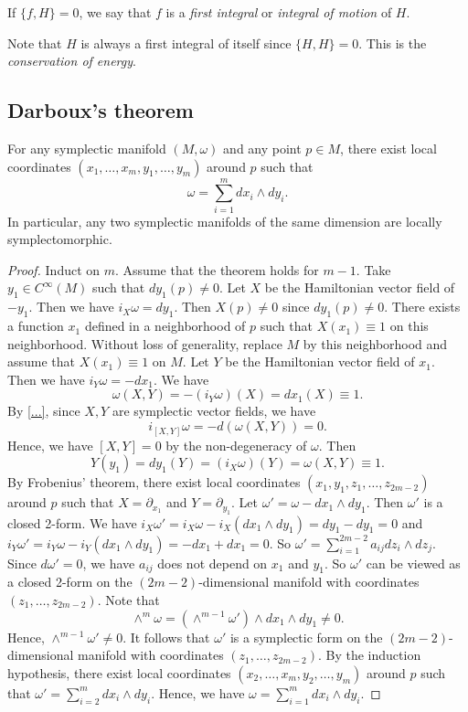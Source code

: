   \begin{definition}
    If $\{f,H\} = 0$, we say that $f$ is a \emph{first integral} or \emph{integral of motion} of $H$.
  \end{definition}

  Note that $H$ is always a first integral of itself since $\{H,H\} = 0$.
  This is the \emph{conservation of energy}.


\subsection{Darboux's theorem}

  \begin{theorem}\label{thm:Darboux}
    For any symplectic manifold $(M,\omega)$ and any point $p \in M$, there exist local coordinates $(x_1, \ldots, x_m, y_1, \ldots, y_m)$ around $p$ such that
    \[ \omega = \sum_{i=1}^m dx_i \wedge dy_i. \]
   In particular, any two symplectic manifolds of the same dimension are locally symplectomorphic.
  \end{theorem}
  \begin{proof}
    Induct on $m$.
    Assume that the theorem holds for $m-1$.
    Take $y_1 \in C^\infty(M)$ such that $dy_1(p) \neq 0$.
    Let $X$ be the Hamiltonian vector field of $-y_1$.
    Then we have $i_X \omega = dy_1$.
    Then $X(p) \neq 0$ since $dy_1(p) \neq 0$.
    There exists a function $x_1$ defined in a neighborhood of $p$ such that $X(x_1) \equiv 1$ on this neighborhood.
    Without loss of generality, replace $M$ by this neighborhood and assume that $X(x_1) \equiv 1$ on $M$.
    Let $Y$ be the Hamiltonian vector field of $x_1$.
    Then we have $i_Y \omega = -dx_1$.
    We have
    \[ \omega(X,Y) = -(i_Y \omega)(X) = dx_1(X) \equiv 1. \]
    By \cref{...}, since $X,Y$ are symplectic vector fields, we have 
    \[ i_{[X,Y]} \omega =  - d(\omega(X,Y)) = 0. \]
    Hence, we have $[X,Y] = 0$ by the non-degeneracy of $\omega$.
    Then 
    \[ Y(y_1) = dy_1(Y) = (i_X \omega)(Y) = \omega(X,Y) \equiv 1. \]
    By Frobenius' theorem, there exist local coordinates $(x_1, y_1, z_1, \ldots, z_{2m-2})$ around $p$ such that $X = \partial_{x_1}$ and $Y = \partial_{y_1}$.
    Let $\omega' = \omega - dx_1 \wedge dy_1$.
    Then $\omega'$ is a closed 2-form.
    We have $i_X \omega' = i_X \omega - i_X (dx_1 \wedge dy_1) = dy_1 - dy_1 = 0$ and $i_Y \omega' = i_Y \omega - i_Y (dx_1 \wedge dy_1) = -dx_1 + dx_1 = 0$.
    So $\omega' = \sum_{i=1}^{2m-2} a_{ij} dz_i \wedge dz_j$.
    Since $d\omega' = 0$, we have $a_{ij}$ does not depend on $x_1$ and $y_1$.
    So $\omega'$ can be viewed as a closed 2-form on the $(2m-2)$-dimensional manifold with coordinates $(z_1, \ldots, z_{2m-2})$.
    Note that 
    \[ \wedge^m \omega = \left(\wedge^{m-1} \omega'\right) \wedge dx_1 \wedge dy_1 \neq 0. \]
    Hence, $\wedge^{m-1} \omega' \neq 0$.
    It follows that $\omega'$ is a symplectic form on the $(2m-2)$-dimensional manifold with coordinates $(z_1, \ldots, z_{2m-2})$.
    By the induction hypothesis, there exist local coordinates $(x_2, \ldots, x_m, y_2, \ldots, y_m)$ around $p$ such that $\omega' = \sum_{i=2}^m dx_i \wedge dy_i$.
    Hence, we have $\omega = \sum_{i=1}^m dx_i \wedge dy_i$.
  \end{proof}

